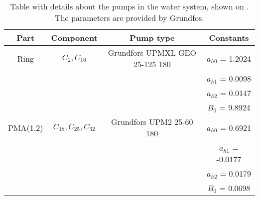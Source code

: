 \begin{table}[]
\centering
\begin{tabular}{c|c|c|c}
Part 	 & Component    		  & Pump type 					 	& Constants 	    \\ \hline
Ring     & $C_2,C_{16}$ 		  & Grundfors UPMXL GEO 25-125 180  & $a_{h0}$ = 1.2024 \\
		 &				 		  &								 	& $a_{h1}$ = 0.0098 \\
		 &						  &								 	& $a_{h2}$ = 0.0147 \\
		 &						  &								 	& $B_{0}$ = 9.8924  \\ \hline 
PMA(1,2) & $C_{18},C_{25},C_{32}$ & Grundfors UPM2 25-60 180	    & $a_{h0}$ = 0.6921 \\
		 &				 		  &								 	& $a_{h1}$ = -0.0177\\
		 &						  &								 	& $a_{h2}$ = 0.0179 \\
		 &						  &								 	& $B_{0}$ = 0.0698  
\end{tabular}
\caption{Table with details about the pumps in the water system, shown on . The parameters are provided by Grundfos.}
\label{tab:pump_detail}
\end{table}
